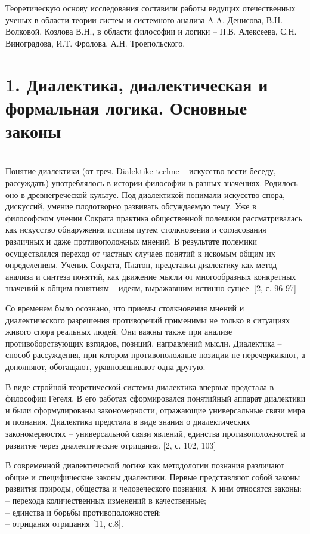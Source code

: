 \documentclass[a4paper,12pt]{report}
\begin{document}
	Теоретическую основу исследования составили работы ведущих отечественных ученых в области теории систем и системного анализа A.A. Денисова, В.Н. Волковой, Козлова В.Н., в области философии и логики  – П.В. Алексеева, С.Н. Виноградова, И.Т. Фролова, А.Н. Троепольского.\\



\chapter*{1.  Диалектика, диалектическая и формальная логика. Основные законы }
 \\

Понятие диалектики (от греч. Dialektike techne – искусство вести беседу, рассуждать) употреблялось в истории философии в разных значениях. Родилось оно в древнегреческой культуе. Под диалектикой понимали искусство спора, дискуссий, умение плодотворно развивать обсуждаемую тему. Уже в философском учении Сократа практика общественной полемики рассматривалась как искусство обнаружения истины путем столкновения и согласования различных и даже противоположных мнений. В результате полемики осуществлялся переход от частных случаев понятий к искомым общим их определениям. Ученик Сократа, Платон, представил диалектику как метод анализа и синтеза понятий, как движение мысли от многообразных конкретных значений к общим понятиям – идеям, выражавшим истинно сущее. [2, с. 96-97] 

	Со временем было осознано, что приемы столкновения мнений и диалектического разрешения противоречий применимы не только в ситуациях живого спора реальных людей. Они важны также при анализе противоборствующих взглядов, позиций, направлений мысли. Диалектика – способ рассуждения, при котором противоположные позиции не перечеркивают, а дополняют, обогащают, уравновешивают одна другую. 

	В виде стройной теоретической системы диалектика впервые предстала в философии Гегеля. В его работах сформировался понятийный аппарат диалектики и были сформулированы закономерности, отражающие универсальные связи мира и познания. Диалектика предстала в виде знания о диалектических закономерностях – универсальной связи явлений, единства противоположностей и развитие через диалектические отрицания. [2, с. 102, 103]

	В современной диалектической логике как методологии познания различают общие и специфические законы диалектики. Первые представляют собой законы развития природы, общества и человеческого познания. К ним относятся законы:\\
\hspace*{0.7cm}	– перехода количественных изменений в качественные; \\
\hspace*{0.7cm}	– единства и борьбы противоположностей;\\
\hspace*{0.7cm}	– отрицания отрицания [11, с.8].
	
\end{document}
